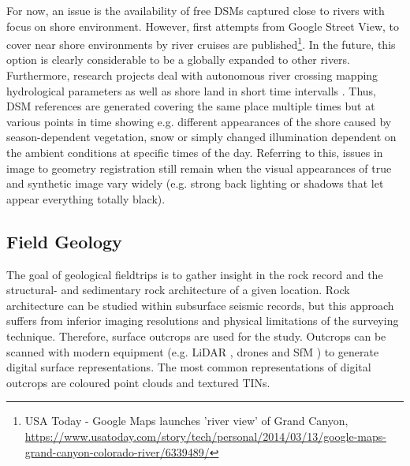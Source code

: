 \documentclass[review]{elsarticle}
\begin{document}
For now, an issue is the availability of free \glspl{DSM} captured close to rivers with focus on shore environment. However, first attempts from Google Street View, to cover near shore environments by river cruises are published\footnote{USA Today - Google Maps launches 'river view' of Grand Canyon, \url{https://www.usatoday.com/story/tech/personal/2014/03/13/google-maps-grand-canyon-colorado-river/6339489/}}. In the future, this option is clearly considerable to be a globally expanded to other rivers. Furthermore, research projects deal with autonomous
river crossing mapping hydrological parameters as well as shore land in short time intervalls \cite{Sardemann2018}. Thus, \gls{DSM} references are generated covering the same place multiple times but at various points in time showing e.g. different appearances of the shore caused by season-dependent vegetation, snow or simply changed illumination dependent on the ambient conditions at specific times of the day. Referring to this, issues in image to geometry registration still remain when the visual appearances of true and synthetic image vary widely (e.g. strong back lighting or shadows that let appear everything totally black). 







\subsection{Field Geology}
\label{sec:applications:field_geology}

The goal of geological fieldtrips is to gather insight in the rock record and the structural- and sedimentary rock architecture of a given location. Rock architecture can be studied within subsurface seismic records, but this approach suffers from inferior imaging resolutions and physical limitations of the surveying technique. Therefore, surface outcrops are used for the study. Outcrops can be scanned with modern equipment (e.g. \gls{LiDAR} \cite{Buckley2008a,Buckley2010}, drones \cite{Dewez2015} and \gls{SfM} \cite{Chandler2016}) to generate digital surface representations. The most common representations of digital outcrops are coloured point clouds and textured \glspl{TIN}.
\end{document}
